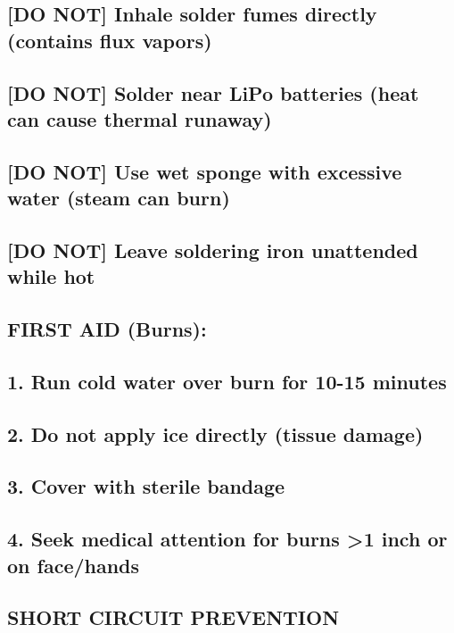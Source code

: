 \documentclass[11pt,letterpaper]{article}
\begin{document}
{{\subsection*{[DO NOT] Inhale solder fumes directly (contains flux vapors)}

\subsection*{[DO NOT] Solder near LiPo batteries (heat can cause thermal runaway)}

\subsection*{[DO NOT] Use wet sponge with excessive water (steam can burn)}

\subsection*{[DO NOT] Leave soldering iron unattended while hot}

\subsection*{FIRST AID (Burns):}

\subsection*{1. Run cold water over burn for 10-15 minutes}

\subsection*{2. Do not apply ice directly (tissue damage)}

\subsection*{3. Cover with sterile bandage}

\subsection*{4. Seek medical attention for burns >1 inch or on face/hands}

\subsection*{SHORT CIRCUIT PREVENTION}

}}
\end{document}
